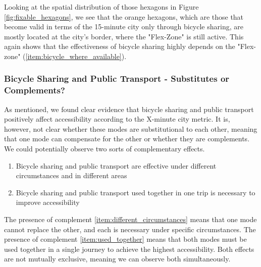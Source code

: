 Looking at the spatial distribution of those hexagons in Figure \ref{fig:fixable_hexagons}, we see that the orange hexagons, which are those that become valid in terms of the 15-minute city only through bicycle sharing, are mostly located at the city's border, where the "Flex-Zone" is still active.
This again shows that the effectiveness of bicycle sharing highly depends on the "Flex-zone" (\ref{item:bicycle_where_available}).






\subsubsection{Bicycle Sharing and Public Transport - Substitutes or Complements?}
As mentioned, we found clear evidence that bicycle sharing and public transport positively affect accessibility according to the X-minute city metric.
It is, however, not clear whether these modes are substitutional to each other, meaning that one mode can compensate for the other or whether they are complements.
We could potentially observe two sorts of complementary effects.
\begin{enumerate}
  \renewcommand{\labelenumi}{Complement \theenumi.}
  \item Bicycle sharing and public transport are effective under different circumstances and in different areas \label{item:different_circumstances}
  \item Bicycle sharing and public transport used together in one trip is necessary to improve accessibility \label{item:used_together}
\end{enumerate}
The presence of complement \ref{item:different_circumstances} means that one mode cannot replace the other, and each is necessary under specific circumstances.
The presence of complement \ref{item:used_together} means that both modes must be used together in a single journey to achieve the highest accessibility.
Both effects are not mutually exclusive, meaning we can observe both simultaneously.

